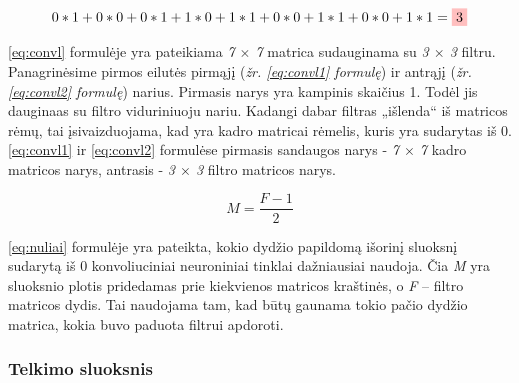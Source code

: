 \documentclass{VUMIFInfKursinis}
\begin{document}
\begin{equation}\label{eq:convl2}
	0*1+0*0+0*1+1*0+1*1+0*0+1*1+0*0+1*1=\colorbox{pink}{3}
\end{equation}

\ref{eq:convl} formulėje yra pateikiama \textit{7 $\times$ 7} matrica sudauginama su \textit{3 $\times$ 3} filtru. Panagrinėsime pirmos eilutės pirmąjį (\textit{žr. \ref{eq:convl1} formulę}) ir antrąjį (\textit{žr. \ref{eq:convl2} formulę}) narius. Pirmasis narys yra kampinis skaičius 1. Todėl jis dauginaas su filtro viduriniuoju nariu. Kadangi dabar filtras „išlenda“ iš matricos rėmų, tai įsivaizduojama, kad yra kadro matricai rėmelis, kuris yra sudarytas iš 0. \ref{eq:convl1} ir \ref{eq:convl2} formulėse pirmasis sandaugos narys - \textit{7 $\times$ 7} kadro matricos narys, antrasis - \textit{3 $\times$ 3} filtro matricos narys.

\begin{equation}\label{eq:nuliai}
M=\frac{F-1}{2}
\end{equation}

\ref{eq:nuliai} formulėje yra pateikta, kokio dydžio papildomą išorinį sluoksnį sudarytą iš 0 konvoliuciniai neuroniniai tinklai dažniausiai naudoja. Čia \textit{M} yra sluoksnio plotis pridedamas prie kiekvienos matricos kraštinės, o \textit{F} – filtro matricos dydis. Tai naudojama tam, kad būtų gaunama tokio pačio dydžio matrica, kokia buvo paduota filtrui apdoroti.


\subsubsection{Telkimo sluoksnis}
\end{document}
